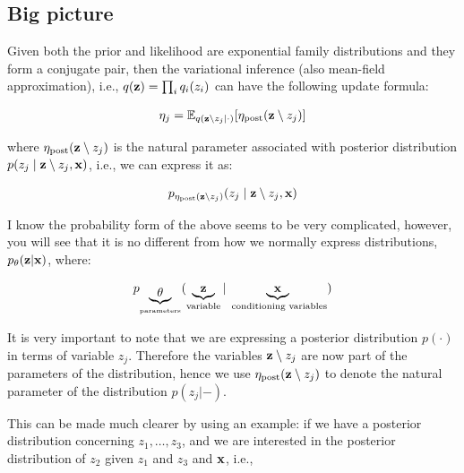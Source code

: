 \documentclass{article}
\def\post{\text{post}}
\begin{document}
\subsection{Big picture}

Given both the prior and likelihood are exponential family distributions and they form a conjugate pair, then the variational inference (also mean-field approximation), i.e., $q({\mathbf z}) = \prod_i q_i(z_i)$ can have the following update formula:

\begin{equation}\begin{split}\label{eq exponential family update}
\eta_j =  \E_{q(\z \setminus z_j | \cdot)} [\eta_\post (\z \setminus z_j )]
\end{split}\end{equation}

where $\eta_\post (\z \setminus z_j )$ is the natural parameter associated with posterior distribution $p( z_j \; | \; {\mathbf z} \setminus z_j , {\mathbf x}  )$, i.e., we can express it as: 

\begin{equation}
	\begin{split}
	p_{\eta_\post (\z \setminus z_j )}( z_j \; | \; \z \setminus z_j , \x  )
	\end{split}
\end{equation}

I know the probability form of the above seems to be very complicated, however, you will see that it is no different from how we normally express distributions, $p_{\theta}({\mathbf z} | {\mathbf x})$, where:


\begin{equation}\begin{split}
p_{\underbrace{\theta}_{\text{parameters}}}(\underbrace{{\mathbf z}}_{\text{variable}} | \underbrace{{\mathbf x}}_{\text{ conditioning variables}})
\end{split}\end{equation}


\vspace{2mm}

It is very important to note that we are expressing a posterior distribution $p(\cdot) $ in terms of variable $z_j$. Therefore the variables ${\mathbf z} \setminus z_j$ are now part of the parameters of the distribution, hence we use $\eta_\post (\z \setminus z_j )$ to denote the natural parameter of the distribution $p(z_j | -)$.


This can be made much clearer by using an example: if we have a posterior distribution concerning $z_1, \dots, z_3$, and we are interested in the posterior distribution of $z_2$ given $z_1$ and $z_3$ and ${\mathbf x}$, i.e.,
\end{document}
